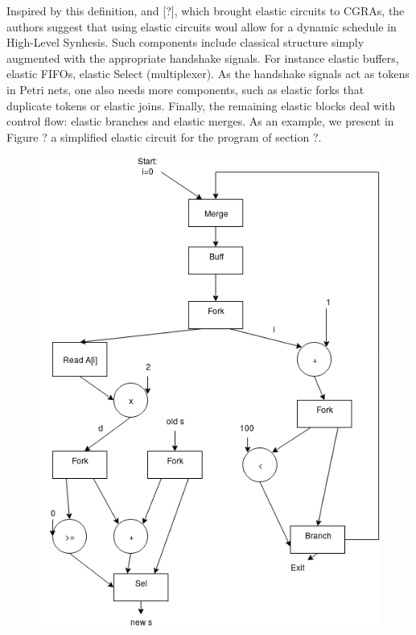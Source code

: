 \documentclass{article}
\begin{document}
Inspired by this definition, and [?], which brought elastic circuits to CGRAs, the authors suggest that using elastic circuits woul allow for a dynamic schedule in High-Level Synhesis.
Such components include classical structure simply augmented with the appropriate handshake signals. For instance elastic buffers, elastic FIFOs, elastic Select (multiplexer). As the handshake signals act as tokens in Petri nets, one also needs more components, such as elastic forks that duplicate tokens or elastic joins. Finally, the remaining elastic blocks deal with control flow: elastic branches and elastic merges.
As an example, we present in Figure ? a simplified elastic circuit for the program of section ?.
\begin{figure}
  \center
  \includegraphics[scale=0.3]{circuit.png}
\end{figure}
\end{document}
